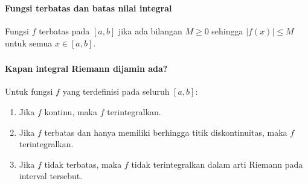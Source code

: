 \documentclass{../../kalkulus-ppt}
\begin{document}
\begin{frame}
\frametitle{\insertsection}
\framesubtitle{Fungsi terbatas dan batas nilai integral}

\begin{definisi}
Fungsi $f$ terbatas pada $[a,b]$ jika ada bilangan $M\ge0$ sehingga $|f(x)|\le M$ untuk semua $x\in[a,b]$.
\end{definisi}
\end{frame}

\begin{frame}
\frametitle{\insertsection}
\framesubtitle{Kapan integral Riemann dijamin ada?}

\begin{teorema}
Untuk fungsi $f$ yang terdefinisi pada seluruh $[a,b]$:
\begin{enumerate}
\item Jika $f$ kontinu, maka $f$ terintegralkan.
\item Jika $f$ terbatas dan hanya memiliki berhingga titik diskontinuitas, maka $f$ terintegralkan.
\item Jika $f$ tidak terbatas, maka $f$ tidak terintegralkan dalam arti Riemann pada interval tersebut.
\end{enumerate}
\end{teorema}
\end{frame}
\end{document}
